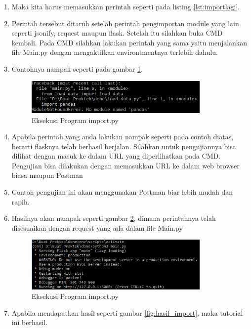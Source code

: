 \begin{enumerate}
\item Maka kita harus memasukkan perintah seperti pada listing \ref{lst:importlagi}.

\item Perintah tersebut ditaruh setelah perintah pengimportan module yang lain seperti jsonify, request maupun flask. Setelah itu silahkan buka CMD kembali. Pada CMD silahkan lakukan perintah yang sama yaitu menjalankan file Main.py dengan mengaktifkan environtmentnya terlebih dahulu.
\item Contohnya nampak seperti pada gambar \ref{fig:eksekusi_fungsi13}.
\begin{figure}[!htbp]
	\centerline{\includegraphics[width=0.85\textwidth]{figures/8/eksekusi_fungsi13.png}}
	\caption{Eksekusi Program import.py}
	\label{fig:eksekusi_fungsi13}
\end{figure}
\item Apabila perintah yang anda lakukan nampak seperti pada contoh diatas, berarti flasknya telah berhasil berjalan. Silahkan untuk pengujiannya bisa dilihat dengan masuk ke dalam URL yang diperlihatkan pada CMD. Pengujian bisa dilakukan dengan memasukkan URL ke dalam web browser biasa maupun Postman
\item Contoh pengujian ini akan menggunakan Postman biar lebih mudah dan rapih.
\item Hasilnya akan nampak seperti gambar \ref{fig:eksekusi_fungsi14}, dimana perintahnya telah disesuaikan dengan request yang ada dalam file Main.py
\begin{figure}[!htbp]
	\centerline{\includegraphics[width=0.85\textwidth]{figures/8/eksekusi_fungsi14.png}}
	\caption{Eksekusi Program import.py}
	\label{fig:eksekusi_fungsi14}
\end{figure}
\item Apabila mendapatkan hasil seperti gambar \ref{fig:hasil_import}, maka tutorial ini berhasil. 

\end{enumerate}
